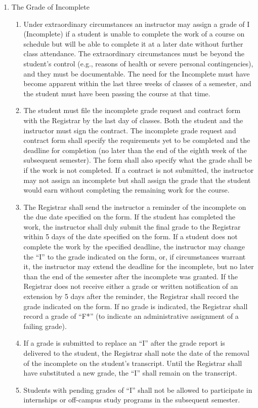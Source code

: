 \documentclass{manual}
\newcommand{\itemLevelA}{\alph*.}
\newcommand{\itemLevelB}{\arabic*)}
\newcommand{\itemRefA}{\alph*}
\newcommand{\itemRefB}{\arabic*}
\begin{document}
\begin{enumerate}[label=\itemLevelA,ref=\itemRefA]
\begin{enumerate}[label=\itemLevelB,ref=\itemRefB]
					\end{enumerate}
				
				\item The Grade of Incomplete

					\begin{enumerate}[label=\itemLevelB,ref=\itemRefB]
					\item Under extraordinary circumstances an instructor may assign a grade of I (Incomplete) if a student is unable to complete the work of a course on schedule but will be able to complete it at a later date without further class attendance. The extraordinary circumstances must be beyond the student's control (e.g., reasons of health or severe personal contingencies), and they must be documentable. The need for the Incomplete must have become apparent within the last three weeks of classes of a semester, and the student must have been passing the course at that time.
					\item The student must file the incomplete grade request and contract form with the Registrar by the last day of classes. Both the student and the instructor must sign the contract. The incomplete grade request and contract form shall specify the requirements yet to be completed and the deadline for completion (no later than the end of the eighth week of the subsequent semester). The form shall also specify what the grade shall be if the work is not completed. If a contract is not submitted, the instructor may not assign an incomplete but shall assign the grade that the student would earn without completing the remaining work for the course.
					\item The Registrar shall send the instructor a reminder of the incomplete on the due date specified on the form. If the student has completed the work, the instructor shall duly submit the final grade to the Registrar within 5 days of the date specified on the form. If a student does not complete the work by the specified deadline, the instructor may change the ``I'' to the grade indicated on the form, or, if circumstances warrant it, the instructor may extend the deadline for the incomplete, but no later than the end of the semester after the incomplete was granted. If the Registrar does not receive either a grade or written notification of an extension by 5 days after the reminder, the Registrar shall record the grade indicated on the form. If no grade is indicated, the Registrar shall record a grade of ``F*'' (to indicate an administrative assignment of a failing grade).
					\item If a grade is submitted to replace an ``I'' after the grade report is delivered to the student, the Registrar shall note the date of the removal of the incomplete on the student's transcript. Until the Registrar shall have substituted a new grade, the ``I'' shall remain on the transcript.
					\item Students with pending grades of ``I'' shall not be allowed to participate in internships or off-campus study programs in the subsequent semester.
					\end{enumerate}
				

\end{enumerate}
\end{document}
